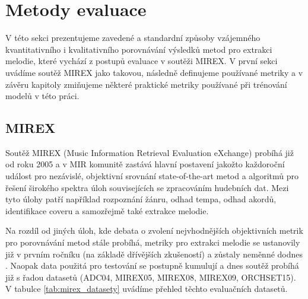 \chapter{Metody evaluace}\label{chap:evaluace}

V této sekci prezentujeme zavedené a standardní způsoby vzájemného kvantitativního i kvalitativního porovnávání výsledků metod pro extrakci melodie, které vychází z postupů evaluace v soutěži MIREX. V první sekci uvádíme soutěž MIREX jako takovou, následně definujeme používané metriky a v závěru kapitoly zmiňujeme některé praktické metriky používané při trénování modelů v této práci.

\section{MIREX}

Soutěž MIREX (Music Information Retrieval Evaluation eXchange) probíhá již od roku 2005 a v MIR komunitě zastává hlavní postavení jakožto každoroční událost pro nezávislé, objektivní srovnání state-of-the-art metod a algoritmů pro řešení širokého spektra úloh souvisejících se zpracováním hudebních dat. Mezi tyto úlohy patří například rozpoznání žánru, odhad tempa, odhad akordů, identifikace coveru a samozřejmě také extrakce melodie.

Na rozdíl od jiných úloh, kde debata o zvolení nejvhodnějších objektivních metrik pro porovnávání metod stále probíhá, metriky pro extrakci melodie se ustanovily již v prvním ročníku (na základě dřívějších zkušeností) a zůstaly neměnné dodnes \citep{Raffel2014}. Naopak data použitá pro testování se postupně kumulují a dnes soutěž probíhá již s řadou datasetů (ADC04, MIREX05, MIREX08, MIREX09, ORCHSET15). V tabulce \ref{tab:mirex_datasety} uvádíme přehled těchto evaluačních datasetů.

